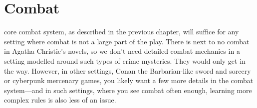 \chapter{Combat}
\label{chap:combat}

 core combat system, as described in the previous chapter, will suffice for any setting where combat is not a large part of the play. There is next to no combat in Agatha Christie's novels, so we don't need detailed combat mechanics in a setting modelled around such types of crime mysteries. They would only get in the way. However, in other settings, Conan the Barbarian-like sword and sorcery or cyberpunk mercenary games, you likely want a few more details in the combat system---and in such settings, where you see combat often enough, learning more complex rules is also less of an issue.
